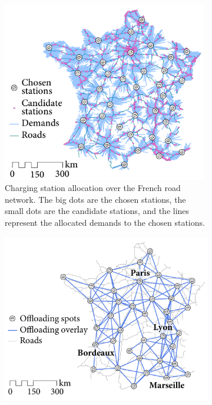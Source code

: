 \begin{figure}[ht]
    \centering
    \begin{subfigure}[t]{0.47\columnwidth}
            \centering
            \includegraphics[width=0.98\textwidth]{figures/France-allocation-charging-stations.pdf}
            \caption{Charging station allocation over the French road network. The big dots are the chosen stations, the small dots are the candidate stations, and the lines represent the allocated demands to the chosen stations.}
            \label{fig:France-location-allocation}
    \end{subfigure}%
    \quad %
    \begin{subfigure}[t]{0.5\columnwidth}
            \centering
            \includegraphics[width=\textwidth]{figures/France-overlay-wo-capacity.pdf}

\end{subfigure}
\end{figure}
